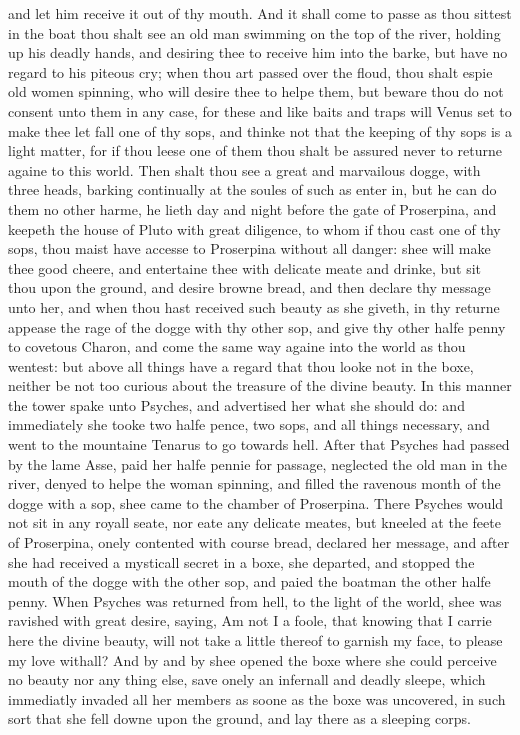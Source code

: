 and let him receive it out of thy mouth. And it shall come to passe as thou
sittest in the boat thou shalt see an old man swimming on the top of the river,
holding up his deadly hands, and desiring thee to receive him into the barke,
but have no regard to his piteous cry; when thou art passed over the floud,
thou shalt espie old women spinning, who will desire thee to helpe them, but
beware thou do not consent unto them in any case, for these and like baits and
traps will Venus set to make thee let fall one of thy sops, and thinke not that
the keeping of thy sops is a light matter, for if thou leese one of them thou
shalt be assured never to returne againe to this world. Then shalt thou see a
great and marvailous dogge, with three heads, barking continually at the soules
of such as enter in, but he can do them no other harme, he lieth day and night
before the gate of Proserpina, and keepeth the house of Pluto with great
diligence, to whom if thou cast one of thy sops, thou maist have accesse to
Proserpina without all danger: shee will make thee good cheere, and entertaine
thee with delicate meate and drinke, but sit thou upon the ground, and desire
browne bread, and then declare thy message unto her, and when thou hast
received such beauty as she giveth, in thy returne appease the rage of the
dogge with thy other sop, and give thy other halfe penny to covetous Charon,
and come the same way againe into the world as thou wentest: but above all
things have a regard that thou looke not in the boxe, neither be not too
curious about the treasure of the divine beauty. In this manner the tower
spake unto Psyches, and advertised her what she should do: and immediately she
tooke two halfe pence, two sops, and all things necessary, and went to the
mountaine Tenarus to go towards hell. After that Psyches had passed by the lame
Asse, paid her halfe pennie for passage, neglected the old man in the river,
denyed to helpe the woman spinning, and filled the ravenous month of the dogge
with a sop, shee came to the chamber of Proserpina. There Psyches would not sit
in any royall seate, nor eate any delicate meates, but kneeled at the feete of
Proserpina, onely contented with course bread, declared her message, and after
she had received a mysticall secret in a boxe, she departed, and stopped the
mouth of the dogge with the other sop, and paied the boatman the other halfe
penny. When Psyches was returned from hell, to the light of the world, shee was
ravished with great desire, saying, Am not I a foole, that knowing that I
carrie here the divine beauty, will not take a little thereof to garnish my
face, to please my love withall? And by and by shee opened the boxe where she
could perceive no beauty nor any thing else, save onely an infernall and deadly
sleepe, which immediatly invaded all her members as soone as the boxe was
uncovered, in such sort that she fell downe upon the ground, and lay there as a
sleeping corps.

